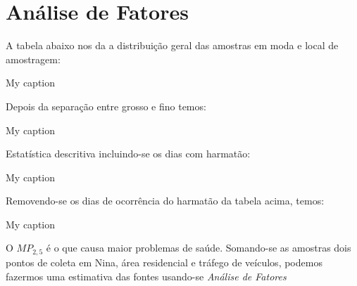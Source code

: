 \section{Análise de Fatores}

A tabela abaixo nos da a distribuição geral das amostras em moda e local de amostragem:

\begin{table}[H]
 \centering
 \caption{My caption}
 
\end{table}

Depois da separação entre grosso e fino temos:
\begin{table}[H]
 \centering
 \caption{My caption}
 
\end{table}

Estatística descritiva incluindo-se os dias com harmatão:
\begin{table}[H]
 \centering
 \caption{My caption}
 
\end{table}

Removendo-se os dias de ocorrência do harmatão da tabela acima, temos:
\begin{table}[H]
 \centering
 \caption{My caption}
 
\end{table}

O $MP_{2,5}$ é o que causa maior problemas de saúde. Somando-se as amostras dois pontos de coleta em Nina, área residencial e tráfego de veículos, podemos fazermos uma estimativa das fontes usando-se \textit{Análise de Fatores} 


















